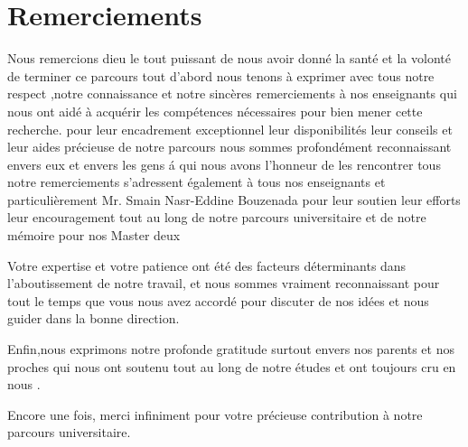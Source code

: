\chapter*{Remerciements}

Nous remercions dieu  le tout  puissant de nous avoir donné la santé et la volonté de terminer ce parcours  tout d’abord  nous tenons à exprimer avec tous notre respect ,notre connaissance  et notre  sincères remerciements  à nos enseignants  qui  nous ont aidé à acquérir les compétences nécessaires pour bien mener  cette recherche. pour leur encadrement exceptionnel leur disponibilités  leur conseils et leur aides précieuse de notre parcours  nous sommes profondément reconnaissant envers eux et envers les gens á  qui nous avons l’honneur de les rencontrer tous notre remerciements s’adressent également à tous nos  enseignants et particulièrement Mr. Smain Nasr-Eddine Bouzenada pour leur soutien  leur efforts leur  encouragement tout au long de notre parcours universitaire et de notre mémoire  pour nos  Master deux 

Votre expertise et votre patience ont été des facteurs déterminants dans l'aboutissement de notre travail, et nous sommes vraiment reconnaissant pour tout le temps que vous nous avez accordé pour discuter de nos idées et nous guider dans la bonne direction.

Enfin,nous exprimons notre profonde gratitude surtout  envers nos parents et nos  proches qui nous ont soutenu tout au long de notre études et ont toujours cru en nous .

Encore une fois, merci infiniment pour votre précieuse contribution à notre parcours universitaire.


